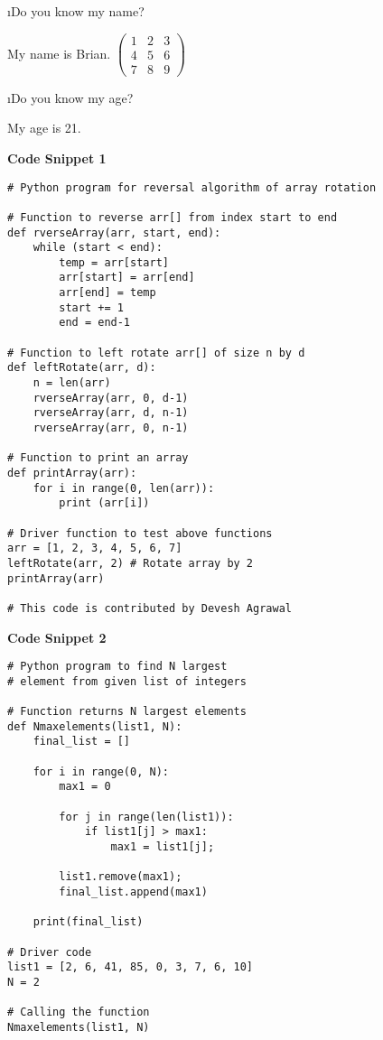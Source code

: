 \documentclass[fleqn]{article}
\begin{document}
\bee
\i Do you know my name?
\begin{tcolorbox}
My name is Brian. \newline  \newline  $\begin{pmatrix}
1 & 2 & 3\\
4 & 5 & 6\\
7 & 8 & 9
\end{pmatrix}$

\end{tcolorbox}
\i Do you know my age?
\begin{tcolorbox}
My age is 21.
\end{tcolorbox}
\ene
\leavevmode\newline
\textbf{Code Snippet 1}
\begin{lstlisting}[basicstyle=\footnotesize\ttfamily, breaklines]
# Python program for reversal algorithm of array rotation
  
# Function to reverse arr[] from index start to end
def rverseArray(arr, start, end):
    while (start < end):
        temp = arr[start]
        arr[start] = arr[end]
        arr[end] = temp
        start += 1
        end = end-1
  
# Function to left rotate arr[] of size n by d
def leftRotate(arr, d):
    n = len(arr)
    rverseArray(arr, 0, d-1)
    rverseArray(arr, d, n-1)
    rverseArray(arr, 0, n-1)
  
# Function to print an array
def printArray(arr):
    for i in range(0, len(arr)):
        print (arr[i])
  
# Driver function to test above functions
arr = [1, 2, 3, 4, 5, 6, 7]
leftRotate(arr, 2) # Rotate array by 2
printArray(arr)
  
# This code is contributed by Devesh Agrawal
\end{lstlisting}
\textbf{Code Snippet 2}
\begin{lstlisting}[basicstyle=\footnotesize\ttfamily, breaklines]
# Python program to find N largest
# element from given list of integers
  
# Function returns N largest elements
def Nmaxelements(list1, N):
    final_list = []
  
    for i in range(0, N): 
        max1 = 0
          
        for j in range(len(list1)):     
            if list1[j] > max1:
                max1 = list1[j];
                  
        list1.remove(max1);
        final_list.append(max1)
          
    print(final_list)
  
# Driver code
list1 = [2, 6, 41, 85, 0, 3, 7, 6, 10]
N = 2
  
# Calling the function
Nmaxelements(list1, N)
\end{lstlisting}
\end{document}

